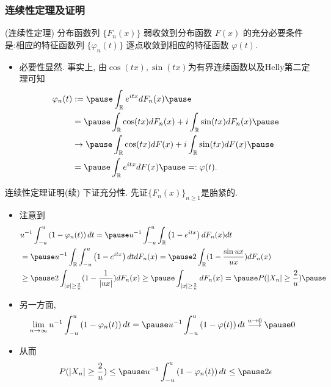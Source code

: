 \documentclass[Prob-All.tex]{subfiles}
\begin{document}
\begin{frame}
	\frametitle{连续性定理及证明}

	\begin{thm}
		(连续性定理) 分布函数列 $\{F_n (x)\}$ 弱收敛到分布函数 $F (x)$ 的充分必要条件是:相应的特征函数列 $\{\varphi_n (t)\}$ 逐点收敛到相应的特征函数 $\varphi (t)$.
	\end{thm}
\pause

\zheng

\begin{itemize}[<+-|alert@+>]
\item 必要性显然. \pause 事实上, 由$\cos(tx), \sin(tx)$为有界连续函数以及Helly第二定理可知
\begin{align*}
	\varphi_n(t)&:=\pause \int_{\mathbb{R}}e^{itx}dF_n(x)\pause
	\\
	&=\pause \int_{\mathbb{R}}\cos(tx)dF_n(x)+i\int_{\mathbb{R}}\sin(tx)dF_n(x)\pause
	\\
	&\rightarrow\pause \int_{\mathbb{R}}\cos(tx)dF(x)+i\int_{\mathbb{R}}\sin(tx)dF(x)\pause
	\\
	&=\pause \int_{\mathbb{R}}e^{itx}dF(x)\pause
	=:\varphi(t).
\end{align*}
\end{itemize}


\end{frame}
\begin{frame}{连续性定理证明(续)}
下证充分性. 先证$\{F_n(x)\}_{n\geq 1}$是胎紧的.
\begin{itemize}[<+-|alert@+>]
\item 注意到
\begin{align*}
	&u^{-1} \int_{-u}^{u}\left(1-\varphi_{n}(t)\right) d t=\pause u^{-1} \int_{-u}^{u}\int_{\mathbb{R}}\left(1-e^{itx}\right)dF_n(x) d t
	\\ &=\pause u^{-1}\int_{\mathbb{R}}\int_{-u}^{u}\left(1-e^{itx}\right)dt dF_n(x)=\pause 2\int_{\mathbb{R}}(1-\frac{\sin ux}{ux})dF_n(x)\\
	&\geq \pause 2 \int_{|x|\geq\frac{2}{u}}(1-\frac{1}{|ux|})dF_n(x)\geq \pause \int_{|x|\geq\frac{2}{u}}dF_n(x)=\pause P(|X_n|\geq \frac{2}{u})\pause
\end{align*}
\item 另一方面,
\begin{align*}
	&\lim_{n\rightarrow\infty}u^{-1} \int_{-u}^{u}\left(1-\varphi_{n}(t)\right) d t=\pause u^{-1} \int_{-u}^{u}\left(1-\varphi(t)\right) d t \stackrel{u\rightarrow 0}{\longrightarrow} \pause 0
\end{align*}


\item 从而
\[P(|X_n|\geq \frac{2}{u})\leq \pause u^{-1} \int_{-u}^{u}\left(1-\varphi_{n}(t)\right) d t \leq \pause 2 \epsilon
\]
\end{itemize}

\end{frame}
\end{document}
